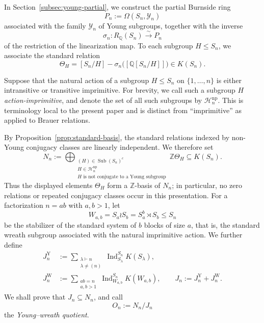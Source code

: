 \documentclass[a4paper,11pt]{article}
\numberwithin{equation}{section}
\newcommand{\Q}{\mathbb{Q}}
\newcommand{\Z}{\mathbb{Z}}
\newcommand{\Ind}{\operatorname{Ind}}
\begin{document}
In Section~\ref{subsec:young-partial}, we construct the partial Burnside ring
\[
  P_n:=\Omega(S_n,\mathcal Y_n)
\]
associated with the family $\mathcal Y_n$ of Young subgroups, together with the inverse
\[
  \sigma_n:R_{\Q}(S_n)\xrightarrow{\sim}P_n
\]
of the restriction of the linearization map. To each subgroup $H\le S_n$, we associate the standard relation
\begin{equation}\label{eq:theta-intro}
  \Theta_H=[S_n/H]-\sigma_n\bigl([\Q[S_n/H]]\bigr)\in K(S_n).
\end{equation}

Suppose that the natural action of a subgroup $H\le S_n$ on $\{1,\ldots,n\}$ is either intransitive or transitive imprimitive. For brevity, we call such a subgroup $H$ \emph{action-imprimitive}, and denote the set of all such subgroups by $\mathcal H_n^{\mathrm{np}}$. This is terminology local to the present paper and is distinct from ``imprimitive'' as applied to Brauer relations.

By Proposition~\ref{prop:standard-basis}, the standard relations indexed by
non-Young conjugacy classes are linearly independent. We therefore set
\begin{equation}\label{eq:N-intro}
  N_n
  :=
  \bigoplus_{\substack{
    (H)\in\operatorname{Sub}(S_n)^c\\
    H\in\mathcal H_n^{\mathrm{np}}\\
    H\text{ is not conjugate to a Young subgroup}
  }}
  \Z\Theta_H
  \subseteq K(S_n).
\end{equation}
Thus the displayed elements $\Theta_H$ form a $\Z$-basis of $N_n$; in
particular, no zero relations or repeated conjugacy classes occur in this
presentation. For a factorization $n=ab$ with $a,b>1$, let
\[
  W_{a,b}=S_a\wr S_b=S_a^b\rtimes S_b\le S_n
\]
be the stabilizer of the standard system of $b$ blocks of size $a$, that is, the standard wreath subgroup associated with the natural imprimitive action. We further define
\begin{align}
 J_n^{\mathrm Y}
 &:=\sum_{\substack{\lambda\vdash n\\\lambda\ne(n)}}
 \Ind_{S_\lambda}^{S_n}K(S_\lambda),\\
 J_n^{\mathrm W}
 &:=\sum_{\substack{ab=n\\a,b>1}}
 \Ind_{W_{a,b}}^{S_n}K(W_{a,b}),
 \qquad J_n:=J_n^{\mathrm Y}+J_n^{\mathrm W}.
 \label{eq:J-intro}
\end{align}
We shall prove that $J_n\subseteq N_n$, and call
\[
  O_n:=N_n/J_n
\]
the \emph{Young--wreath quotient}.
\end{document}
